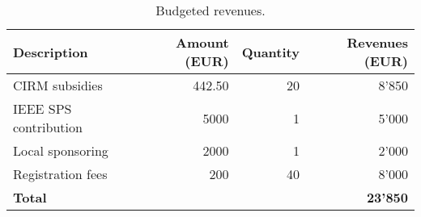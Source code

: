 \documentclass[a4paper]{scrartcl}
\begin{document}
\begin{table}[ht]
	\centering
	\begin{tabular}{|l|r|r|r|}
	\hline
	Description & Amount (EUR) & Quantity & Revenues (EUR) \\
	\hline
	CIRM subsidies        & 442.50 & 20 & 8'850 \\
	IEEE SPS contribution & 5000   &  1 & 5'000 \\
	Local sponsoring      & 2000   &  1 & 2'000 \\
	Registration fees     &  200   & 40 & 8'000 \\
	\hline
	\multicolumn{3}{|l|}{\textbf{Total}} & \textbf{23'850} \\
	\hline
	\end{tabular}
	\caption{Budgeted revenues.}
	\label{tab:revenues}
\end{table}

\printbibliography
\end{document}
